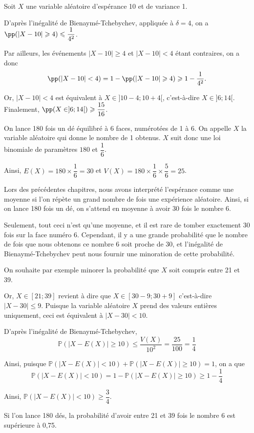 \documentclass[11pt,fleqn, openany]{book} %
\begin{document}
\begin{example}Soit $X$ une variable aléatoire d'espérance 10 et de variance 1.

D'après l'inégalité de Bienaymé-Tchebychev, appliquée à $\delta = 4$, on a $\pp(|X-10|\geqslant 4) \leqslant \dfrac{1}{4^2}$.

Par ailleurs, les événements $|X-10|\geqslant 4$ et $|X-10|<4$ étant contraires, on a donc \[\pp(|X-10|< 4) = 1 - \pp(|X-10|\geqslant 4) \geqslant 1-\dfrac{1}{4^2}.\]

Or, $|X-10|<4$ est équivalent à $X \in ]10-4 ; 10+4[$, c'est-à-dire $X\in ]6 ; 14[$. Finalement, $\pp(X\in ]6 ;14[) \geqslant \dfrac{15}{16}$.\end{example}

\begin{example} On lance 180 fois un dé équilibré à 6 faces, numérotées de 1 à 6. On appelle $X$ la variable aléatoire qui donne le nombre de 1 obtenus. $X$ suit donc une loi binomiale de paramètres $180$ et $\dfrac{1}{6}$.

Ainsi, $E(X)=180 \times \dfrac{1}{6}=30$ et $V(X)=180 \times \dfrac{1}{6} \times \dfrac{5}{6}=25$. 

Lors des précédentes chapitres, nous avons interprété l'espérance comme une moyenne si l'on répète un grand nombre de fois une expérience aléatoire. Ainsi, si on lance 180 fois un dé, on s'attend en moyenne à avoir 30 fois le nombre 6.

Seulement, tout ceci n'est qu'une moyenne, et il est rare de tomber exactement 30 fois sur la face numéro 6. Cependant, il y a une grande probabilité que le nombre de fois que nous obtenons ce nombre 6 soit proche de 30, et l'inégalité de Bienaymé-Tchebychev peut nous fournir une minoration de cette probabilité.


On souhaite par exemple minorer la probabilité que $X$ soit compris entre 21 et 39. 

Or, $X\in[21 ;39]$ revient à dire que $X \in [30-9 ; 30+9]$ c'est-à-dire $|X-30| \leqslant 9$. Puisque la variable aléatoire $X$ prend des valeurs entières uniquement, ceci est équivalent à $|X-30|<10$.

D'après l'inégalité de Bienaymé-Tchebychev, 
\[ \mathbb{P}( |X-E(X)| \geqslant 10) \leqslant \dfrac{V(X)}{10^2} =\dfrac{25}{100}=\dfrac{1}{4}\]

Ainsi, puisque $\mathbb{P}( |X-E(X)| <10)+\mathbb{P}( |X-E(X)|\geqslant 10)=1$, on a que \[\mathbb{P}( |X-E(X)| < 10)=1-\mathbb{P}( |X-E(X)| \geqslant 10) \geqslant 1- \dfrac{1}{4}\]

Ainsi, $\mathbb{P}( |X-E(X)| < 10) \geqslant \dfrac{3}{4}$.

Si l'on lance 180 dés, la probabilité d'avoir entre 21 et 39 fois le nombre 6 est supérieure à 0,75.\end{example}
\end{document}
